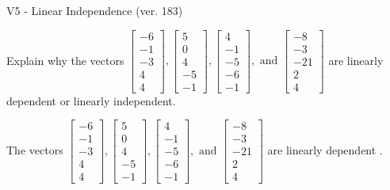 \begin{exercise}
  \begin{exerciseTitle}V5 - Linear Independence (ver. 183)\end{exerciseTitle}
  \begin{exerciseStatement}
    Explain why the vectors \(\left[\begin{array}{r}
-6 \\
-1 \\
-3 \\
4 \\
4
\end{array}\right] , \left[\begin{array}{r}
5 \\
0 \\
4 \\
-5 \\
-1
\end{array}\right] , \left[\begin{array}{r}
4 \\
-1 \\
-5 \\
-6 \\
-1
\end{array}\right] , \text{ and } \left[\begin{array}{r}
-8 \\
-3 \\
-21 \\
2 \\
4
\end{array}\right]\) are linearly dependent or linearly independent.	


  \end{exerciseStatement}
  \begin{exerciseAnswer}
   The vectors \(\left[\begin{array}{r}
-6 \\
-1 \\
-3 \\
4 \\
4
\end{array}\right] , \left[\begin{array}{r}
5 \\
0 \\
4 \\
-5 \\
-1
\end{array}\right] , \left[\begin{array}{r}
4 \\
-1 \\
-5 \\
-6 \\
-1
\end{array}\right] , \text{ and } \left[\begin{array}{r}
-8 \\
-3 \\
-21 \\
2 \\
4
\end{array}\right]\) are 
  	 linearly dependent  .
  


  \end{exerciseAnswer}
\end{exercise}